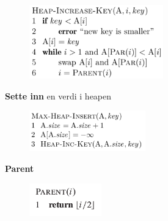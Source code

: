 \documentclass[12pt]{report}
\begin{document}
\begin{multicols}{2}

\begin{figure}[H]
	\begin{Center}
		\includegraphics[width=2.28in,height=1.25in]{./media/image91.png}
	\end{Center}
\end{figure}



\par

{\fontsize{13pt}{15.6pt}\selectfont \textbf{Sette inn} en verdi i heapen\par}\par




\begin{figure}[H]
	\begin{Center}
		\includegraphics[width=1.98in,height=0.69in]{./media/image92.png}
	\end{Center}
\end{figure}



\par

{\fontsize{13pt}{15.6pt}\selectfont \textbf{Parent}\par}\par




\begin{figure}[H]
	\begin{Center}
		\includegraphics[width=1.23in,height=0.56in]{./media/image93.png}
	\end{Center}
\end{figure}



\end{multicols}
\end{document}
